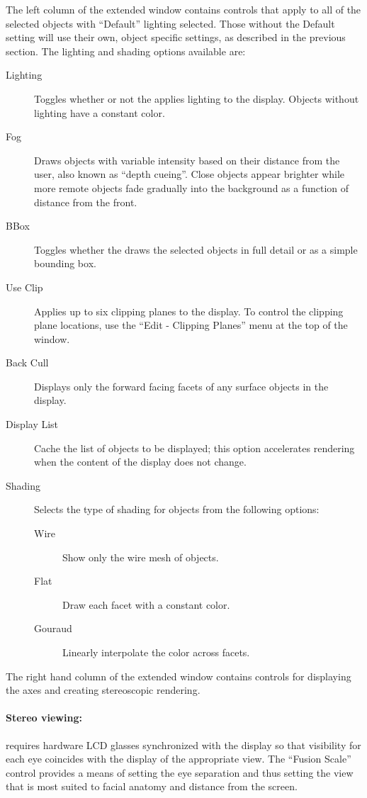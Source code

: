 The left column of the extended \viewer{} window contains controls that
apply to all of the selected objects with ``Default'' lighting selected.
Those without the Default setting will use their own, object specific
settings, as described in the previous section.  The lighting and shading
options available are:
%
\begin{description}
  \item [Lighting] Toggles whether or not the \viewer{} applies lighting
        to the display.  Objects without lighting have a constant
        color.
  \item [Fog] Draws objects with variable intensity based on their
        distance from the user, also known as ``depth cueing''.  Close
        objects appear brighter while more remote objects fade gradually
        into the background as a function of distance from the front.
  \item [BBox] Toggles whether the \viewer{} draws the selected objects
        in full detail or as a simple bounding box.
  \item [Use Clip] Applies up to six clipping planes to the display.
        To control the clipping plane locations, use the
        ``Edit -\ra{} Clipping Planes'' menu at the top of the
        \viewer{} window.
  \item [Back Cull] Displays only the forward facing facets of any surface
        objects in the display.
  \item [Display List] Cache the list of objects to be displayed; this
        option accelerates rendering when the content of the display does
        not change. 
  \item [Shading] Selects the type of shading for objects from the
        following options:
        \begin{description}
          \item [Wire] Show only the wire mesh of objects.
          \item [Flat] Draw each facet with a constant color.
          \item [Gouraud] Linearly interpolate the color across facets. 
        \end{description}
\end{description}

The right hand column of the extended \viewer{} window contains controls
for displaying the axes and creating stereoscopic rendering.  

\paragraph{Stereo viewing: } requires hardware LCD glasses synchronized
with the display so that visibility for each eye coincides with the
display of the appropriate view.  The ``Fusion Scale'' control provides a
means of setting the eye separation and thus setting the view that is most
suited to facial anatomy and distance from the screen.

